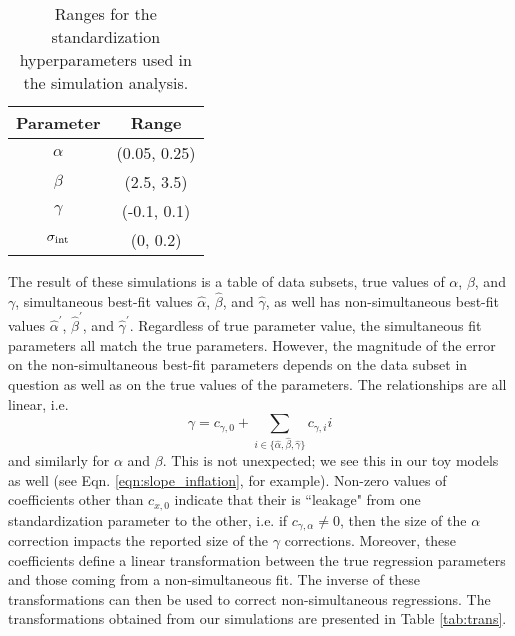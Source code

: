 \begin{table}
    \centering
    \begin{tabular}{cc}
    \toprule
        Parameter & Range \\\midrule
        $\alpha$ & (0.05, 0.25) \\
        $\beta$ & (2.5, 3.5) \\
        $\gamma$ & (-0.1, 0.1) \\
        $\sigma_{\text{int}}$ & (0, 0.2) \\\bottomrule
    \end{tabular}
    \caption{Ranges for the standardization hyperparameters used in the simulation analysis.}
    \label{tab:sim_ranges}
\end{table}

The result of these simulations is a table of data subsets, true values of $\alpha$, $\beta$, and $\gamma$, simultaneous best-fit values $\hat{\alpha}$, $\hat{\beta}$, and $\hat{\gamma}$, as well has non-simultaneous best-fit values $\hat{\alpha}^\prime$, $\hat{\beta}^\prime$, and $\hat{\gamma}^\prime$. Regardless of true parameter value, the simultaneous fit parameters all match the true parameters. However, the magnitude of the error on the non-simultaneous best-fit parameters depends on the data subset in question as well as on the true values of the parameters. The relationships are all linear, i.e.
\begin{equation}
    \gamma = c_{\gamma, 0} + \displaystyle\sum_{i\in\{\hat{\alpha}, \hat{\beta}, \hat{\gamma}\}} c_{\gamma, i}i
\end{equation}
and similarly for $\alpha$ and $\beta$. This is not unexpected; we see this in our toy models as well (see Eqn. \ref{eqn:slope_inflation}, for example). Non-zero values of coefficients other than $c_{x, 0}$ indicate that their is ``leakage" from one standardization parameter to the other, i.e. if $c_{\gamma, \alpha} \neq 0$, then the size of the $\alpha$ correction impacts the reported size of the $\gamma$ corrections. Moreover, these coefficients define a linear transformation between the true regression parameters and those coming from a non-simultaneous fit. The inverse of these transformations can then be used to correct non-simultaneous regressions. The transformations obtained from our simulations are presented in Table \ref{tab:trans}.

